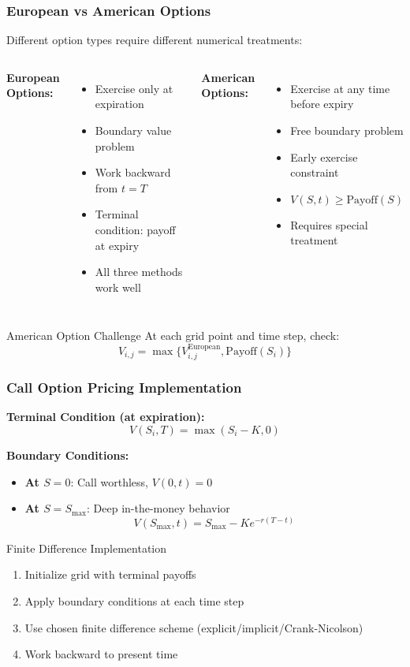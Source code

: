 \documentclass{beamer}
\begin{document}
\begin{frame}
\frametitle{European vs American Options}
Different option types require different numerical treatments:

\begin{columns}
\textbf{European Options:}
\begin{itemize}
\item Exercise only at expiration
\item Boundary value problem
\item Work backward from \(t = T\)
\item Terminal condition: payoff at expiry
\item All three methods work well
\end{itemize}

\textbf{American Options:}
\begin{itemize}
\item Exercise at any time before expiry
\item Free boundary problem
\item Early exercise constraint
\item \(V(S,t) \geq \text{Payoff}(S)\)
\item Requires special treatment
\end{itemize}
\end{columns}

\begin{block}{American Option Challenge}
At each grid point and time step, check:
\[V_{i,j} = \max\{V_{i,j}^{\text{European}}, \text{Payoff}(S_i)\}\]
\end{block}
\end{frame}

\begin{frame}
\frametitle{Call Option Pricing Implementation}
\textbf{Terminal Condition (at expiration):}
\[V(S_i, T) = \max(S_i - K, 0)\]

\textbf{Boundary Conditions:}
\begin{itemize}
\item \textbf{At \(S = 0\)}: Call worthless, \(V(0,t) = 0\)
\item \textbf{At \(S = S_{\max}\)}: Deep in-the-money behavior
\[V(S_{\max},t) = S_{\max} - Ke^{-r(T-t)}\]
\end{itemize}

\begin{block}{Finite Difference Implementation}
\begin{enumerate}
\item Initialize grid with terminal payoffs
\item Apply boundary conditions at each time step
\item Use chosen finite difference scheme (explicit/implicit/Crank-Nicolson)
\item Work backward to present time
\end{enumerate}
\end{block}
\end{frame}
\end{document}
